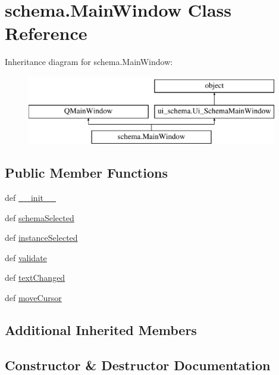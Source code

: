 \hypertarget{classschema_1_1MainWindow}{}\section{schema.\+Main\+Window Class Reference}
\label{classschema_1_1MainWindow}
Inheritance diagram for schema.\+Main\+Window\+:\begin{figure}[H]
\begin{center}
\leavevmode
\includegraphics[height=3.000000cm]{classschema_1_1MainWindow}
\end{center}
\end{figure}
\subsection*{Public Member Functions}
\begin{DoxyCompactItemize}
\item 
def \hyperlink{classschema_1_1MainWindow_a8ced10024497a9f97e339ffb2d5a6e00}{\+\_\+\+\_\+init\+\_\+\+\_\+}
\item 
def \hyperlink{classschema_1_1MainWindow_a8c45d6f822fdb47a473906b1cdba03a7}{schema\+Selected}
\item 
def \hyperlink{classschema_1_1MainWindow_a98f1d0f3797199e586aa21fd42b4609c}{instance\+Selected}
\item 
def \hyperlink{classschema_1_1MainWindow_a94dae0f2a446615bdbd0159ac3200ef7}{validate}
\item 
def \hyperlink{classschema_1_1MainWindow_a9d4c8e53a4f868eef5091637b4348af0}{text\+Changed}
\item 
def \hyperlink{classschema_1_1MainWindow_aee3c9a0c87a20db54cc3906fa404a6c8}{move\+Cursor}
\end{DoxyCompactItemize}
\subsection*{Additional Inherited Members}


\subsection{Constructor \& Destructor Documentation}
\hypertarget{classschema_1_1MainWindow_a8ced10024497a9f97e339ffb2d5a6e00}{}
